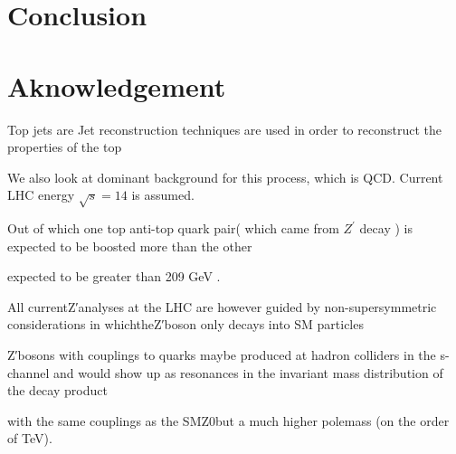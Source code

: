\documentclass[12pt,a4paper]{article}		%
\begin{document}
\section{Conclusion}
\newpage
\section{Aknowledgement}	 
	\newpage 

   Top jets are Jet reconstruction techniques are used in order to reconstruct the properties of the top     

We also look at dominant background for this process, which is QCD.  Current LHC energy $\sqrt{s} = 14$ is assumed. 


Out of which one top anti-top quark pair( which came from $Z^\prime$ decay ) is expected to be boosted more than the other  


 
expected to be greater than 209 GeV .


  All currentZ′analyses at the LHC are however guided by non-supersymmetric considerations in whichtheZ′boson only decays into SM particles  

Z′bosons with couplings to quarks maybe produced at hadron colliders in the s-channel and would show up as resonances in the invariant mass distribution of the decay product
 

with  the  same  couplings  as  the  SMZ0but a much higher polemass (on the order of TeV).     
\end{document}

